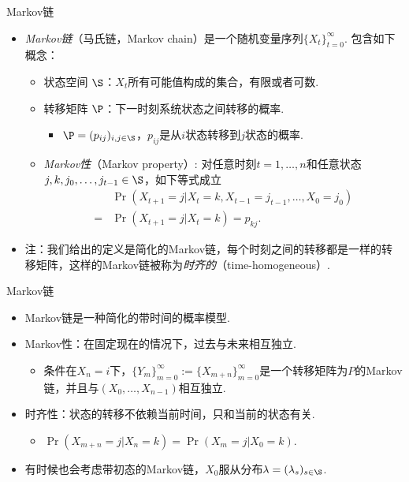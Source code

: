 \begin{frame}{Markov链}
\begin{itemize}
    \item \emph{Markov链}（马氏链，Markov chain）是一个随机变量序列$\{X_t\}_{t=0}^{\infty}$. 包含如下概念：
\begin{itemize}
	\item 状态空间 $\S$：$X_t$所有可能值构成的集合，有限或者可数.
	\item 转移矩阵 $\P$：下一时刻系统状态之间转移的概率.
		\begin{itemize}
        \item $\P=(p_{ij})_{i,j\in \S}$，$p_{ij}$是从$i$状态转移到$j$状态的概率.
		\end{itemize}		
		\item \emph{Markov性}（Markov property）: 对任意时刻$t=1,\dots,n$和任意状态$j,k,j_0,\dots,j_{t-1}\in \S$，如下等式成立
		\begin{align*}
		   &\Pr(X_{t+1}=j| X_t=k,X_{t-1}=j_{t-1},\dots,X_0=j_0)\\
		   =& \Pr(X_{t+1}=j| X_{t}=k)=p_{kj}.
		\end{align*}
    \end{itemize}
	\item 注：我们给出的定义是简化的Markov链，每个时刻之间的转移都是一样的转移矩阵，这样的Markov链被称为\emph{时齐的}（time-homogeneous）.
\end{itemize}
\end{frame}

\begin{frame}{Markov链}
\begin{itemize}
    \item Markov链是一种简化的带时间的概率模型.
    \item Markov性：在固定现在的情况下，过去与未来相互独立.
    \begin{itemize}
        \item 条件在$X_n=i$下，$\{Y_m\}_{m=0}^{\infty}:=\{X_{m+n}\}_{m=0}^{\infty}$是一个转移矩阵为$P$的Markov链，并且与$(X_0,\dots,X_{n-1})$相互独立. %
    \end{itemize}
    \item 时齐性：状态的转移不依赖当前时间，只和当前的状态有关.
    \begin{itemize}
        \item  $\Pr(X_{m+n}=j| X_{n}=k)=\Pr(X_{m}=j| X_{0}=k)$.
    \end{itemize}
    \item 有时候也会考虑带初态的Markov链，$X_0$服从分布$\lambda=(\lambda_s)_{s\in \S}$.
\end{itemize}
\end{frame}

